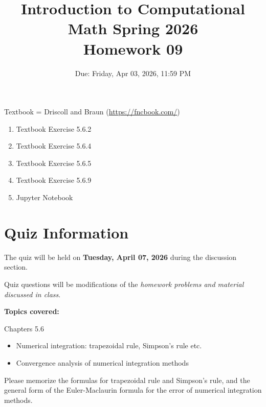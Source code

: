 \documentclass[reqno]{exam}
\title{Introduction to Computational Math Spring 2026 \\ Homework 09}
\date{Due: Friday, Apr 03, 2026, 11:59 PM}
\author{}
\begin{document}
\maketitle
\thispagestyle{empty}

Textbook = Driscoll and Braun (\url{https://fncbook.com/})

\begin{enumerate}

\item Textbook Exercise 5.6.2

\item Textbook Exercise 5.6.4

\item Textbook Exercise 5.6.5

\item Textbook Exercise 5.6.9

\item Jupyter Notebook

\end{enumerate}


\section*{Quiz Information}

The quiz will be held on {\bf Tuesday, April 07, 2026} during the discussion section.

Quiz questions will be modifications of the {\it homework problems and material discussed in class}.

\textbf{Topics covered:} 

Chapters 5.6

\begin{itemize}
    \item Numerical integration: trapezoidal rule, Simpson's rule etc.
    \item Convergence analysis of numerical integration methods
\end{itemize}

Please memorize the formulas for trapezoidal rule and Simpson's rule, and the general form of the Euler-Maclaurin formula for the error of numerical integration methods.
\end{document}
